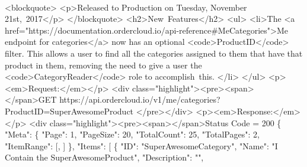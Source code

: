 \documentclass{memoir}%
\begin{document}
\paragraph*{}%
<blockquote>\newline%
<p>Released to Production on Tuesday, November 21st,~2017</p>\newline%
</blockquote>\newline%
<h2>New~Features</h2>\newline%
<ul>\newline%
<li>The <a href="https://documentation.ordercloud.io/api{-}reference\#MeCategories">Me endpoint for categories</a> now has an optional <code>ProductID</code> filter. This allows a user to find all the categories assigned to them that have that product in them, removing the need to give a user the <code>CategoryReader</code> role to accomplish~this.   </li>\newline%
</ul>\newline%
<p><em>Request:</em></p>\newline%
<div class="highlight"><pre><span></span>GET https://api.ordercloud.io/v1/me/categories?ProductID=SuperAwesomeProduct\newline%
</pre></div>\newline%
<p><em>Response:</em></p>\newline%
<div class="highlight"><pre><span></span>Status Code = 200\newline%
\newline%
\{\newline%
  "Meta": \{\newline%
    "Page": 1,\newline%
    "PageSize": 20,\newline%
    "TotalCount": 25,\newline%
    "TotalPages": 2,\newline%
    "ItemRange": {[},\newline%
    {]}\newline%
  \},\newline%
  "Items": {[}\newline%
    \{\newline%
      "ID": "SuperAwesomeCategory",\newline%
      "Name": "I Contain the SuperAwesomeProduct",\newline%
      "Description": "",\newline%
\end{document}
